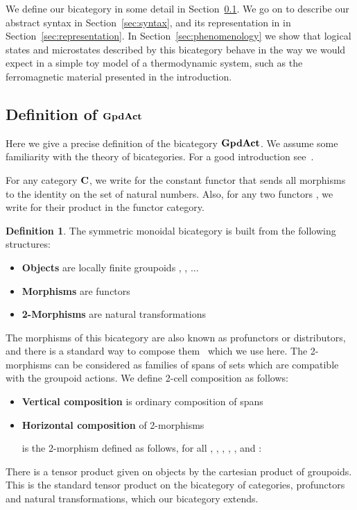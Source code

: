 \documentclass[a4paper,12pt]{article}
\theoremstyle{definition}
\newtheorem{defn}[theorem]{Definition}
\newcommand\cat[1]{{\ensuremath{\bf #1}}}
\renewcommand{\-}[0]{\nobreakdash-\hspace{0pt}}
\newcommand\GA{\cat{GpdAct}{}}
\begin{document}
We define our  bicategory  in some detail in Section~\ref{fulldefinition}. We go on to describe our abstract syntax in Section~\ref{sec:syntax}, and its representation in  in Section~\ref{sec:representation}. In Section~\ref{sec:phenomenology} we show that logical states and microstates described by this bicategory behave in the way we would expect in a simple toy model of a thermodynamic system, such as the ferromagnetic material presented in the introduction.

\subsection{Definition of \GA}
\label{fulldefinition}

\noindent
Here we give a precise definition of the bicategory \GA. We assume some familiarity with the theory of bicategories. For a good introduction see~\mbox{\cite[Chapter 7]{borceux}}.

For any category \cat C, we write  for the constant functor that sends all morphisms to the identity on the set of natural numbers. Also, for any two functors , we write  for their product in the functor category.


\begin{defn}
The symmetric monoidal bicategory  is built from the following structures:
\begin{itemize}
\item \textbf{Objects} are locally finite groupoids , , ...
\item \textbf{Morphisms}  are functors 
\item \textbf{2-Morphisms}  are natural transformations \mbox{}
\end{itemize}
\end{defn}

\noindent
The morphisms of this bicategory are also known as profunctors or distributors, and there is a standard way to compose them~\cite[Proposition 7.8.2]{borceux} which we use here. The 2\-morphisms can be considered as families of spans of sets which are compatible with the groupoid actions. We define 2\-cell composition as follows:
\begin{itemize}
\item \textbf{Vertical composition} is ordinary composition of spans
\item \textbf{Horizontal composition} of 2-morphisms

\vspace{-10pt}


\vspace{-10pt}
is the 2\-morphism  defined as follows, for all , , , , ,  and :

\end{itemize}
There is a tensor product given on objects by the cartesian product of groupoids. This is the standard tensor product on the bicategory of categories, profunctors and natural transformations, which our bicategory extends.
\end{document}
